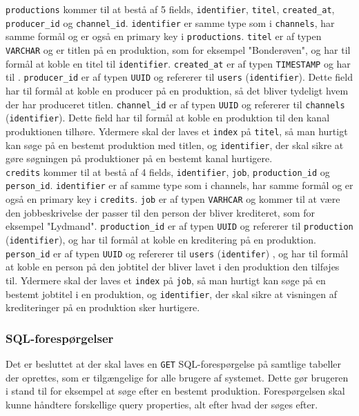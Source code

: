 \texttt{productions} kommer til at bestå af 5 fields, \texttt{identifier}, \texttt{titel}, \texttt{created\_at}, \texttt{producer\_id} og \texttt{channel\_id}.  \texttt{identifier} er samme type som i \texttt{channels}, har samme formål og er også en primary key i \texttt{productions}. \texttt{titel} er af typen \texttt{VARCHAR} og er titlen på en produktion, som for eksempel "Bonderøven", og har til formål at koble en titel til \texttt{identifier}. \texttt{created\_at} er af typen \texttt{TIMESTAMP} og har til . \texttt{producer\_id} er af typen \texttt{UUID} og refererer til \texttt{users} (\texttt{identifier}). Dette field har til formål at koble en producer på en produktion, så det bliver tydeligt hvem der har produceret titlen. \texttt{channel\_id} er af typen \texttt{UUID} og refererer til \texttt{channels} (\texttt{identifier}). Dette field har til formål at koble en produktion til den kanal produktionen tilhøre. Ydermere skal der laves et \texttt{index} på \texttt{titel}, så man hurtigt kan søge på en bestemt produktion med titlen, og \texttt{identifier}, der skal sikre at gøre søgningen på produktioner på en bestemt kanal hurtigere.\\


\texttt{credits} kommer til at bestå af 4 fields, \texttt{identifier}, \texttt{job}, \texttt{production\_id} og \texttt{person\_id}. \texttt{identifier} er af samme type som i channels, har samme formål og er også en primary key i \texttt{credits}. \texttt{job} er af typen \texttt{VARHCAR} og kommer til at være den jobbeskrivelse der passer til den person der bliver krediteret, som for eksempel "Lydmand". \texttt{production\_id} er af typen \texttt{UUID} og refererer til \texttt{production} (\texttt{identifier}), og har til formål at koble en kreditering på en produktion. \texttt{person\_id} er af typen \texttt{UUID} og refererer til  \texttt{users} (\texttt{identifer}) , og har til formål at koble en person på den jobtitel der bliver lavet i den produktion den tilføjes til. Ydermere skal der laves et \texttt{index} på \texttt{job}, så man hurtigt kan søge på en bestemt jobtitel i en produktion, og \texttt{identifier}, der skal sikre at visningen af krediteringer på en produktion sker hurtigere.

\subsubsection{SQL-forespørgelser}
Det er besluttet at der skal laves en \texttt{GET} SQL-forespørgelse på samtlige tabeller der oprettes, som er tilgængelige for alle brugere af systemet. Dette gør brugeren i stand til for eksempel at søge efter en bestemt produktion. Forespørgelsen skal kunne håndtere forskellige query properties, alt efter hvad der søges efter.\\


